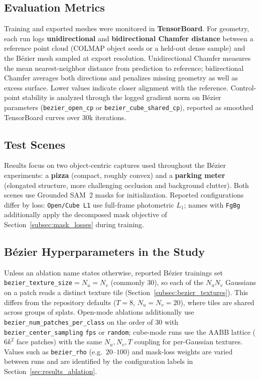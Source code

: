 \documentclass{report}
\begin{document}
\subsection{Evaluation Metrics}
\label{subsec:eval_metrics}

Training and exported meshes were monitored in \textbf{TensorBoard}. For geometry, each run logs \textbf{unidirectional} and \textbf{bidirectional Chamfer distance} between a reference point cloud (COLMAP object seeds or a held-out dense sample) and the B\'ezier mesh sampled at export resolution. Unidirectional Chamfer measures the mean nearest-neighbor distance from prediction to reference; bidirectional Chamfer averages both directions and penalizes missing geometry as well as excess surface. Lower values indicate closer alignment with the reference. Control-point stability is analyzed through the logged gradient norm on B\'ezier parameters (\texttt{bezier\_open\_cp} or \texttt{bezier\_cube\_shared\_cp}), reported as smoothed TensorBoard curves over 30k iterations.

\subsection{Test Scenes}
\label{subsec:test_scenes}

Results focus on two object-centric captures used throughout the B\'ezier experiments: a \textbf{pizza} (compact, roughly convex) and a \textbf{parking meter} (elongated structure, more challenging occlusion and background clutter). Both scenes use Grounded SAM~2 masks for initialization. Reported configurations differ by loss: \texttt{Open/Cube L1} use full-frame photometric $L_1$; names with \texttt{FgBg} additionally apply the decomposed mask objective of Section~\ref{subsec:mask_losses} during training.

\subsection{B\'ezier Hyperparameters in the Study}
\label{subsec:bezier_study_hparams}

Unless an ablation name states otherwise, reported B\'ezier trainings set \texttt{bezier\_texture\_size}$=N_u=N_v$ (commonly $30$), so each of the $N_u N_v$ Gaussians on a patch reads a distinct texture tile (Section~\ref{subsec:bezier_textures}). This differs from the repository defaults ($T{=}8$, $N_u{=}N_v{=}20$), where tiles are shared across groups of splats. Open-mode ablations additionally use \texttt{bezier\_num\_patches\_per\_class} on the order of $30$ with \texttt{bezier\_center\_sampling} \texttt{fps} or \texttt{random}; cube-mode runs use the AABB lattice ($6k^2$ face patches) with the same $N_u,N_v,T$ coupling for per-Gaussian textures. Values such as \texttt{bezier\_rho} (e.g.\ $20$--$100$) and mask-loss weights are varied between runs and are identified by the configuration labels in Section~\ref{sec:results_ablation}.
\end{document}
